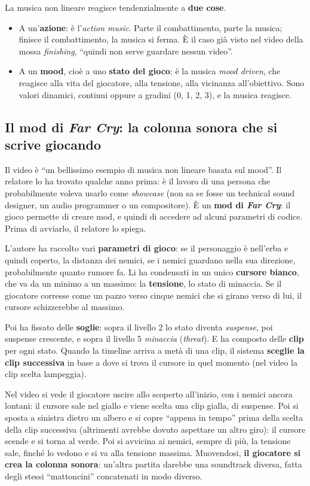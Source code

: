 La musica non lineare reagisce tendenzialmente a \textbf{due cose}.
\begin{itemize}
  \item A un'\textbf{azione}: è l'\emph{action music}. Parte il combattimento,
        parte la musica; finisce il combattimento, la musica si ferma. È il caso
        già visto nel video della mossa \emph{finishing}, ``quindi non serve
        guardare nessun video''.
  \item A un \textbf{mood}, cioè a uno \textbf{stato del gioco}: è la musica
        \emph{mood driven}, che reagisce alla vita del giocatore, alla tensione,
        alla vicinanza all'obiettivo. Sono valori dinamici, continui oppure a
        gradini (0, 1, 2, 3), e la musica reagisce.
\end{itemize}

\subsection{Il mod di \emph{Far Cry}: la colonna sonora che si scrive giocando}

Il video è ``un bellissimo esempio di musica non lineare basata sul mood''. Il
relatore lo ha trovato qualche anno prima: è il lavoro di una persona che
probabilmente voleva usarlo come \emph{showcase} (non sa se fosse un technical
sound designer, un audio programmer o un compositore). È un \textbf{mod di
\emph{Far Cry}}: il gioco permette di creare mod, e quindi di accedere ad alcuni
parametri di codice. Prima di avviarlo, il relatore lo spiega.

L'autore ha raccolto vari \textbf{parametri di gioco}: se il personaggio è
nell'erba e quindi coperto, la distanza dei nemici, se i nemici guardano nella
sua direzione, probabilmente quanto rumore fa. Li ha condensati in un unico
\textbf{cursore bianco}, che va da un minimo a un massimo: la \textbf{tensione},
lo stato di minaccia. Se il giocatore corresse come un pazzo verso cinque nemici
che si girano verso di lui, il cursore schizzerebbe al massimo.

Poi ha fissato delle \textbf{soglie}: sopra il livello 2 lo stato diventa
\emph{suspense}, poi suspense crescente, e sopra il livello 5 \emph{minaccia}
(\emph{threat}). E ha composto delle \textbf{clip} per ogni stato. Quando la
timeline arriva a metà di una clip, il sistema \textbf{sceglie la clip
successiva} in base a dove si trova il cursore in quel momento (nel video la
clip scelta lampeggia).

Nel video si vede il giocatore uscire allo scoperto all'inizio, con i nemici
ancora lontani: il cursore sale nel giallo e viene scelta una clip gialla, di
suspense. Poi si sposta a sinistra dietro un albero e si copre ``appena in
tempo'' prima della scelta della clip successiva (altrimenti avrebbe dovuto
aspettare un altro giro): il cursore scende e si torna al verde. Poi si avvicina
ai nemici, sempre di più, la tensione sale, finché lo vedono e si va alla
tensione massima. Muovendosi, \textbf{il giocatore si crea la colonna sonora}:
un'altra partita darebbe una soundtrack diversa, fatta degli stessi
``mattoncini'' concatenati in modo diverso.


